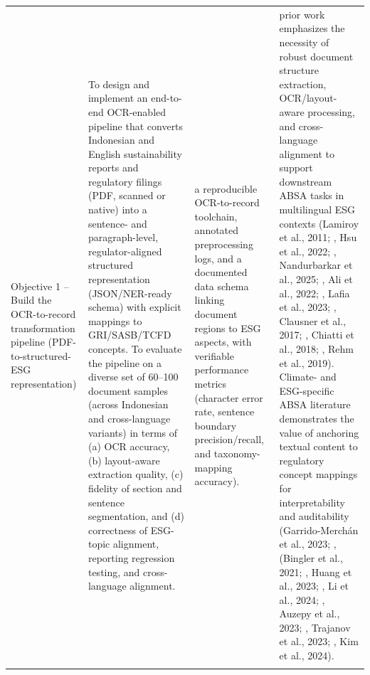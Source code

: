 \begin{landscape}
\begin{longtable}{p{3cm} p{8cm} p{4cm} p{8cm}}
Objective 1 – Build the OCR-to-record transformation pipeline (PDF-to-structured-ESG representation) & To design and implement an end-to-end OCR-enabled pipeline that converts Indonesian and English sustainability reports and regulatory filings (PDF, scanned or native) into a sentence- and paragraph-level, regulator-aligned structured representation (JSON/NER-ready schema) with explicit mappings to GRI/SASB/TCFD concepts. To evaluate the pipeline on a diverse set of 60–100 document samples (across Indonesian and cross-language variants) in terms of (a) OCR accuracy, (b) layout-aware extraction quality, (c) fidelity of section and sentence segmentation, and (d) correctness of ESG-topic alignment, reporting regression testing, and cross-language alignment. & a reproducible OCR-to-record toolchain, annotated preprocessing logs, and a documented data schema linking document regions to ESG aspects, with verifiable performance metrics (character error rate, sentence boundary precision/recall, and taxonomy-mapping accuracy). & prior work emphasizes the necessity of robust document structure extraction, OCR/layout-aware processing, and cross-language alignment to support downstream ABSA tasks in multilingual ESG contexts (Lamiroy et al., 2011; , Hsu et al., 2022; , Nandurbarkar et al., 2025; , Ali et al., 2022; , Lafia et al., 2023; , Clausner et al., 2017; , Chiatti et al., 2018; , Rehm et al., 2019). Climate- and ESG-specific ABSA literature demonstrates the value of anchoring textual content to regulatory concept mappings for interpretability and auditability (Garrido-Merchán et al., 2023; , (Bingler et al., 2021; , Huang et al., 2023; , Li et al., 2024; , Auzepy et al., 2023; , Trajanov et al., 2023; , Kim et al., 2024). \\
\addlinespace

\end{longtable}
\end{landscape}
